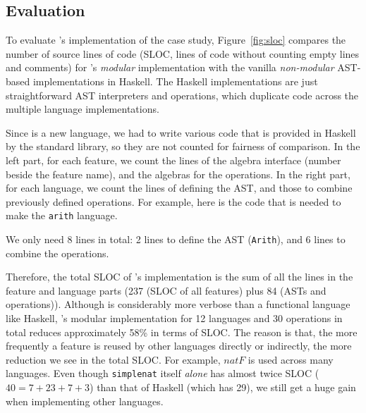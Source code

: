 
\subsection{Evaluation}

To evaluate \name's implementation of the case study,
Figure~\ref{fig:sloc} compares the number of source lines of code
(SLOC, lines of code without counting empty lines and comments) for
\name's \emph{modular} implementation with the vanilla
\emph{non-modular} AST-based implementations in Haskell. The Haskell
implementations are just straightforward AST interpreters and
operations, which duplicate code across the multiple language
implementations.

Since \name is a new language, we
had to write various code that is provided in Haskell by the standard library,
so they are not counted for fairness of comparison. In the left part, for each
feature, we count the lines of the algebra interface (number beside the feature
name), and the algebras for the operations. In the right part, for each
language, we count the lines of defining the AST, and those to combine previously
defined operations. For example, here is the code that is needed to make the
\lstinline{arith} language.


\noindent We only need 8 lines in total: 2 lines to define the AST
(\lstinline{Arith}), and 6 lines to combine the operations.

Therefore, the total SLOC of \name's implementation is the sum of all the
lines in the feature and language parts (237 (SLOC of all features) plus 84
(ASTs and operations)). Although \name is considerably more verbose than a
functional language like Haskell, \name's modular implementation for 12 languages and 30
operations in total reduces approximately 58\% in terms of SLOC. The reason is
that, the more frequently a feature is reused by other languages directly or
indirectly, the more reduction we see in the total SLOC. For example,
$\mathit{natF}$ is used across many languages. Even though \lstinline{simplenat}
itself \textit{alone} has almost twice SLOC ($40 = 7+23+7+3$) than that of Haskell (which
has 29), we still get a huge gain when implementing other languages.



